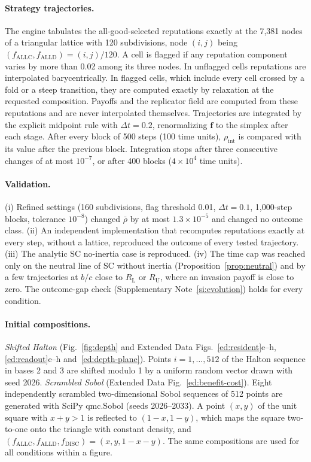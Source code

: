 \documentclass[10pt]{wlscirep}
\newcommand{\ALLC}{\mathrm{ALLC}}
\newcommand{\ALLD}{\mathrm{ALLD}}
\newcommand{\DISC}{\mathrm{DISC}}
\theoremstyle{plain}
\theoremstyle{remark}
\begin{document}
\paragraph{Strategy trajectories.} The engine tabulates the all-good-selected reputations exactly at the 7,381 nodes of a triangular lattice with 120 subdivisions, node $(i,j)$ being $(f_{\ALLC},f_{\ALLD})=(i,j)/120$. A cell is flagged if any reputation component varies by more than 0.02 among its three nodes. In unflagged cells reputations are interpolated barycentrically. In flagged cells, which include every cell crossed by a fold or a steep transition, they are computed exactly by relaxation at the requested composition. Payoffs and the replicator field are computed from these reputations and are never interpolated themselves. Trajectories are integrated by the explicit midpoint rule with $\Delta t=0.2$, renormalizing $\bm f$ to the simplex after each stage. After every block of 500 steps (100 time units), $\rho_{\mathrm{int}}$ is compared with its value after the previous block. Integration stops after three consecutive changes of at most $10^{-7}$, or after 400 blocks ($4\times10^4$ time units).

\paragraph{Validation.} (i) Refined settings (160 subdivisions, flag threshold 0.01, $\Delta t=0.1$, 1,000-step blocks, tolerance $10^{-8}$) changed $\bar\rho$ by at most $1.3\times10^{-5}$ and changed no outcome class. (ii) An independent implementation that recomputes reputations exactly at every step, without a lattice, reproduced the outcome of every tested trajectory. (iii) The analytic SC no-inertia case is reproduced. (iv) The time cap was reached only on the neutral line of SC without inertia (Proposition~\ref{prop:neutral}) and by a few trajectories at $b/c$ close to $R_{\mathrm L}$ or $R_{\mathrm U}$, where an invasion payoff is close to zero. The outcome-gap check (Supplementary Note~\ref{si:evolution}) holds for every condition.

\paragraph{Initial compositions.} \textit{Shifted Halton} (Fig.~\ref{fig:depth} and Extended Data Figs.~\ref{ed:resident}e--h, \ref{ed:readout}e--h and~\ref{ed:depth-plane}). Points $i=1,\ldots,512$ of the Halton sequence in bases 2 and 3 are shifted modulo 1 by a uniform random vector drawn with seed 2026. \textit{Scrambled Sobol} (Extended Data Fig.~\ref{ed:benefit-cost}). Eight independently scrambled two-dimensional Sobol sequences of 512 points are generated with SciPy qmc.Sobol (seeds 2026--2033). A point $(x,y)$ of the unit square with $x+y>1$ is reflected to $(1-x,1-y)$, which maps the square two-to-one onto the triangle with constant density, and $(f_{\ALLC},f_{\ALLD},f_{\DISC})=(x,y,1-x-y)$. The same compositions are used for all conditions within a figure.
\end{document}

